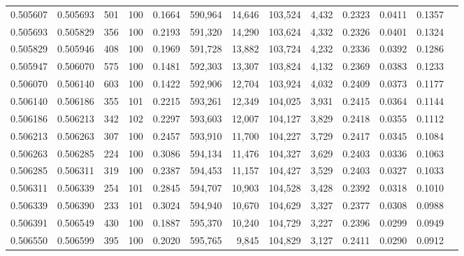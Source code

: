 \begin{tabular}{rrrrrrrrrrrrr}
0.505607 & 0.505693 &   501 & 100 &                                     0.1664 & 590,964 &  14,646 & 103,524 &   4,432 & 0.2323 & 0.0411 & 0.1357 \\
0.505693 & 0.505829 &   356 & 100 &                                     0.2193 & 591,320 &  14,290 & 103,624 &   4,332 & 0.2326 & 0.0401 & 0.1324 \\
0.505829 & 0.505946 &   408 & 100 &                                     0.1969 & 591,728 &  13,882 & 103,724 &   4,232 & 0.2336 & 0.0392 & 0.1286 \\
0.505947 & 0.506070 &   575 & 100 &                                     0.1481 & 592,303 &  13,307 & 103,824 &   4,132 & 0.2369 & 0.0383 & 0.1233 \\
0.506070 & 0.506140 &   603 & 100 &                                     0.1422 & 592,906 &  12,704 & 103,924 &   4,032 & 0.2409 & 0.0373 & 0.1177 \\
0.506140 & 0.506186 &   355 & 101 &                                     0.2215 & 593,261 &  12,349 & 104,025 &   3,931 & 0.2415 & 0.0364 & 0.1144 \\
0.506186 & 0.506213 &   342 & 102 &                                     0.2297 & 593,603 &  12,007 & 104,127 &   3,829 & 0.2418 & 0.0355 & 0.1112 \\
0.506213 & 0.506263 &   307 & 100 &                                     0.2457 & 593,910 &  11,700 & 104,227 &   3,729 & 0.2417 & 0.0345 & 0.1084 \\
0.506263 & 0.506285 &   224 & 100 &                                     0.3086 & 594,134 &  11,476 & 104,327 &   3,629 & 0.2403 & 0.0336 & 0.1063 \\
0.506285 & 0.506311 &   319 & 100 &                                     0.2387 & 594,453 &  11,157 & 104,427 &   3,529 & 0.2403 & 0.0327 & 0.1033 \\
0.506311 & 0.506339 &   254 & 101 &                                     0.2845 & 594,707 &  10,903 & 104,528 &   3,428 & 0.2392 & 0.0318 & 0.1010 \\
0.506339 & 0.506390 &   233 & 101 &                                     0.3024 & 594,940 &  10,670 & 104,629 &   3,327 & 0.2377 & 0.0308 & 0.0988 \\
0.506391 & 0.506549 &   430 & 100 &                                     0.1887 & 595,370 &  10,240 & 104,729 &   3,227 & 0.2396 & 0.0299 & 0.0949 \\
0.506550 & 0.506599 &   395 & 100 &                                     0.2020 & 595,765 &   9,845 & 104,829 &   3,127 & 0.2411 & 0.0290 & 0.0912 \\

\end{tabular}
